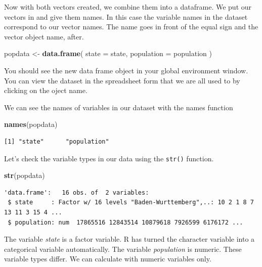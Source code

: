 \documentclass[]{article}
\newenvironment{Shaded}{\begin{snugshade}}{\end{snugshade}}
\newcommand{\KeywordTok}[1]{\textcolor[rgb]{0.13,0.29,0.53}{\textbf{#1}}}
\newcommand{\DataTypeTok}[1]{\textcolor[rgb]{0.13,0.29,0.53}{#1}}
\newcommand{\StringTok}[1]{\textcolor[rgb]{0.31,0.60,0.02}{#1}}
\newcommand{\NormalTok}[1]{#1}
\theoremstyle{definition}
\theoremstyle{definition}
\theoremstyle{definition}
\theoremstyle{remark}
\begin{document}
Now with both vectors created, we combine them into a dataframe. We put
our vectors in and give them names. In this case the variable names in
the dataset correspond to our vector names. The name goes in front of
the equal sign and the vector object name, after.

\begin{Shaded}
\begin{Highlighting}[]
\NormalTok{popdata <-}\StringTok{ }\KeywordTok{data.frame}\NormalTok{( }
  \DataTypeTok{state =}\NormalTok{ state,}
  \DataTypeTok{population =}\NormalTok{ population}
\NormalTok{  )}
\end{Highlighting}
\end{Shaded}

You should see the new data frame object in your global environment
window. You can view the dataset in the spreadsheet form that we are all
used to by clicking on the oject name.

We can see the names of variables in our dataset with the names function

\begin{Shaded}
\begin{Highlighting}[]
\KeywordTok{names}\NormalTok{(popdata)}
\end{Highlighting}
\end{Shaded}

\begin{verbatim}
[1] "state"      "population"
\end{verbatim}

Let's check the variable types in our data using the \texttt{str()}
function.

\begin{Shaded}
\begin{Highlighting}[]
\KeywordTok{str}\NormalTok{(popdata)}
\end{Highlighting}
\end{Shaded}

\begin{verbatim}
'data.frame':   16 obs. of  2 variables:
 $ state     : Factor w/ 16 levels "Baden-Wurttemberg",..: 10 2 1 8 7 13 11 3 15 4 ...
 $ population: num  17865516 12843514 10879618 7926599 6176172 ...
\end{verbatim}

The variable \emph{state} is a factor variable. R has turned the
character variable into a categorical variable automatically. The
variable \emph{population} is numeric. These variable types differ. We
can calculate with numeric variables only.
\end{document}
